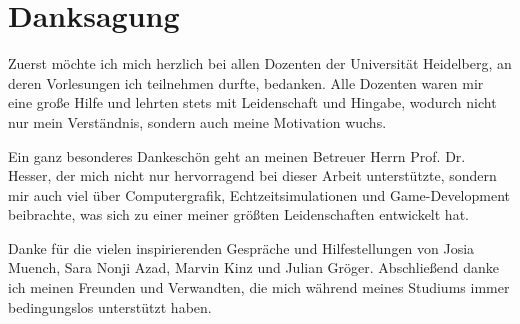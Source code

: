 

\chapter*{Danksagung}
Zuerst möchte ich mich herzlich bei allen Dozenten der Universität Heidelberg, an deren Vorlesungen ich teilnehmen durfte, bedanken. Alle Dozenten waren mir eine große Hilfe und lehrten stets mit Leidenschaft und Hingabe, wodurch nicht nur mein Verständnis, sondern auch meine Motivation wuchs.

Ein ganz besonderes Dankeschön geht an meinen Betreuer Herrn Prof. Dr. Hesser, der mich nicht nur hervorragend bei dieser Arbeit unterstützte, sondern mir auch viel über Computergrafik, Echtzeitsimulationen und Game-Development beibrachte, was sich zu einer meiner größten Leidenschaften entwickelt hat.

Danke für die vielen inspirierenden Gespräche und Hilfestellungen von Josia Muench, Sara Nonji Azad, Marvin Kinz und Julian Gröger. Abschließend danke ich meinen Freunden und Verwandten, die mich während meines Studiums immer bedingungslos unterstützt haben.
